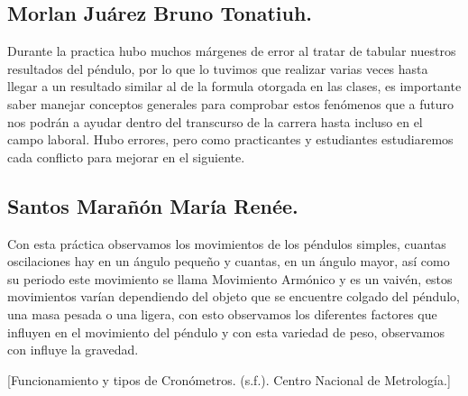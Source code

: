 \documentclass[10pt]{article}
\begin{document}
\begin{multicols}{2}
\subsection*{Morlan Juárez Bruno Tonatiuh.}
Durante la practica hubo muchos márgenes de error al tratar de tabular nuestros resultados del péndulo, por lo que lo tuvimos que realizar varias veces hasta llegar a un resultado similar al de la formula otorgada en las clases, es importante saber manejar conceptos generales para comprobar estos fenómenos que a futuro nos podrán a ayudar dentro del transcurso de la carrera hasta incluso en el campo laboral. Hubo errores, pero como practicantes y estudiantes estudiaremos cada conflicto para mejorar en el siguiente. 
\subsection*{Santos Marañón María Renée.}
Con  esta  práctica  observamos  los movimientos de  los péndulos  simples, cuantas oscilaciones hay en un ángulo pequeño y cuantas, en un ángulo mayor, así como su periodo   este   movimiento   se   llama   Movimiento   Armónico   y   es   un   vaivén,   estos movimientos varían dependiendo del objeto que se encuentre colgado del péndulo, una masa  pesada  o  una  ligera, con esto  observamos  los  diferentes factores que influyen en el movimiento del péndulo y con esta variedad de peso, observamos con influye la gravedad.

\begin{thebibliography}{0}
	[Funcionamiento y tipos de Cronómetros. (s.f.). Centro Nacional de Metrología.]
	
		
\end{thebibliography}

\end{multicols}
\end{document}

